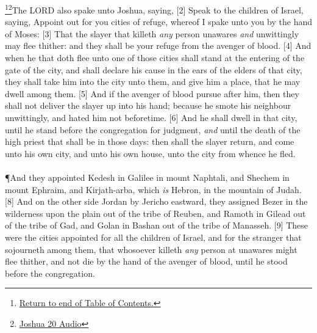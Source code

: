 \footnote{\textcolor[rgb]{0.00,0.25,0.00}{\hyperlink{TOC}{Return to end of Table of Contents.}}}\footnote{\href{https://audiobible.com/bible/joshua_20.html}{\textcolor[cmyk]{0.99998,1,0,0}{Joshua 20 Audio}}}\textcolor[cmyk]{0.99998,1,0,0}{The LORD also spake unto Joshua, saying,}
[2] \textcolor[cmyk]{0.99998,1,0,0}{Speak to the children of Israel, saying, Appoint out for you cities of refuge, whereof I spake unto you by the hand of Moses:}
[3] \textcolor[cmyk]{0.99998,1,0,0}{That the slayer that killeth \emph{any} person unawares \emph{and} unwittingly may flee thither: and they shall be your refuge from the avenger of blood.}
[4] \textcolor[cmyk]{0.99998,1,0,0}{And when he that doth flee unto one of those cities shall stand at the entering of the gate of the city, and shall declare his cause in the ears of the elders of that city, they shall take him into the city unto them, and give him a place, that he may dwell among them.}
[5] \textcolor[cmyk]{0.99998,1,0,0}{And if the avenger of blood pursue after him, then they shall not deliver the slayer up into his hand; because he smote his neighbour unwittingly, and hated him not beforetime.}
[6] \textcolor[cmyk]{0.99998,1,0,0}{And he shall dwell in that city, until he stand before the congregation for judgment, \emph{and} until the death of the high priest that shall be in those days: then shall the slayer return, and come unto his own city, and unto his own house, unto the city from whence he fled.}\\
\\
\P \textcolor[cmyk]{0.99998,1,0,0}{And they appointed Kedesh in Galilee in mount Naphtali, and Shechem in mount Ephraim, and Kirjath-arba, which \emph{is} Hebron, in the mountain of Judah.}
[8] \textcolor[cmyk]{0.99998,1,0,0}{And on the other side Jordan by Jericho eastward, they assigned Bezer in the wilderness upon the plain out of the tribe of Reuben, and Ramoth in Gilead out of the tribe of Gad, and Golan in Bashan out of the tribe of Manasseh.}
[9] \textcolor[cmyk]{0.99998,1,0,0}{These were the cities appointed for all the children of Israel, and for the stranger that sojourneth among them, that whosoever killeth \emph{any} person at unawares might flee thither, and not die by the hand of the avenger of blood, until he stood before the congregation.}